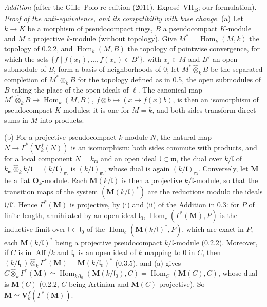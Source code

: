 \medskip\noindent
\emph{Addition} (after the Gille--Polo re-edition (2011), Expos\'e~VII\textsubscript{B}; our formulation).
\emph{Proof of the anti-equivalence, and its compatibility with base change.}
\label{sga3:VIIB:1.2.3.A}%
(a) Let \(k\to K\) be a morphism of pseudocompact rings, \(B\) a pseudocompact \(K\)-module and \(M\) a
projective \(k\)-module (without topology). Give \(M^*=\operatorname{Hom}_k(M,k)\) the topology of 0.2.2,
and \(\operatorname{Hom}_k(M,B)\) the topology of pointwise convergence, for which the sets
\(\{f\mid f(x_1),\ldots,f(x_s)\in B'\}\), with \(x_j\in M\) and \(B'\) an open submodule of \(B\), form a
basis of neighborhoods of \(0\); let \(M^*\widehat\otimes_kB\) be the separated completion of
\(M^*\otimes_kB\) for the topology defined as in 0.5, the open submodules of \(B\) taking the place of the
open ideals of \(\ell\). The canonical map \(M^*\widehat\otimes_kB\to\operatorname{Hom}_k(M,B)\),
\(f\otimes b\mapsto(x\mapsto f(x)b)\), is then an isomorphism of pseudocompact \(K\)-modules: it is one
for \(M=k\), and both sides transform direct sums in \(M\) into products.

(b) For a projective pseudocompact \(k\)-module \(N\), the natural map
\(N\to\Gamma^*(\mathbf V_k^f(N))\) is an isomorphism: both sides commute with products, and for a local
component \(N=k_{\mathfrak m}\) and an open ideal \(\mathfrak l\subset\mathfrak m\), the dual over
\(k/\mathfrak l\) of \(k_{\mathfrak m}\widehat\otimes_kk/\mathfrak l=(k/\mathfrak l)_{\mathfrak m}\) is
\((k/\mathfrak l)_{\mathfrak m}\), whose dual is again \((k/\mathfrak l)_{\mathfrak m}\). Conversely, let
\(\mathbf M\) be a flat \(\mathbf O_k\)-module. Each \(\mathbf M(k/\mathfrak l)\) is then a projective
\(k/\mathfrak l\)-module, so that the transition maps of the system \((\mathbf M(k/\mathfrak l)^*)\) are the
reductions modulo the ideals \(\mathfrak l/\mathfrak l'\). Hence \(\Gamma^*(\mathbf M)\) is projective, by
(i) and (ii) of the Addition in 0.3: for \(P\) of finite length, annihilated by an open ideal
\(\mathfrak l_0\), \(\operatorname{Hom}_c(\Gamma^*(\mathbf M),P)\) is the inductive limit over
\(\mathfrak l\subset\mathfrak l_0\) of the \(\operatorname{Hom}_c(\mathbf M(k/\mathfrak l)^*,P)\), which are
exact in \(P\), each \(\mathbf M(k/\mathfrak l)^*\) being a projective pseudocompact \(k/\mathfrak l\)-module
(0.2.2). Moreover, if \(C\) is in \(\operatorname{Alf}/k\) and \(\mathfrak l_0\) is an open ideal of
\(k\) mapping to \(0\) in \(C\), then \((k/\mathfrak l_0)\widehat\otimes_k\Gamma^*(\mathbf M)=\mathbf
M(k/\mathfrak l_0)^*\) (0.3.5), and (a) gives
\(C\widehat\otimes_k\Gamma^*(\mathbf M)\simeq\operatorname{Hom}_{k/\mathfrak l_0}(\mathbf M(k/\mathfrak
l_0),C)=\operatorname{Hom}_C(\mathbf M(C),C)\), whose dual is \(\mathbf M(C)\) (0.2.2, \(C\) being Artinian
and \(\mathbf M(C)\) projective). So \(\mathbf M\simeq\mathbf V_k^f(\Gamma^*(\mathbf M))\).

